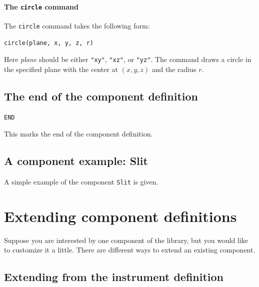 \paragraph{The \texttt{circle} command}

The \texttt{circle} command takes the following form:
\begin{lstlisting}
circle(plane, x, y, z, r)
\end{lstlisting}
Here \textit{plane} should be either \verb+"xy"+, \verb+"xz"+, or
\verb+"yz"+. The command draws a circle in the specified plane with the center
 at $(x, y, z)$ and the radius $r$.



\subsection{The end of the component definition}

\begin{lstlisting}
END
\end{lstlisting}
This marks the end of the component definition.

\subsection{A component example: Slit}
\label{s:slit}
A simple example of the component \texttt{Slit} is given.



\section{Extending component definitions}
\label{s:compdefs-extend}

Suppose you are interested by one component of the \MCS library, but you would
like to customize it a little. There are different ways to extend an existing
component.

\subsection{Extending from the instrument definition}


